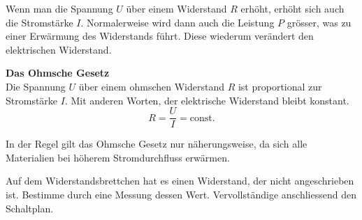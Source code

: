 Wenn man die Spannung $U$ über einem Widerstand $R$ erhöht, erhöht sich auch die Stromstärke $I$.
Normalerweise wird dann auch die Leistung $P$ grösser, was zu einer Erwärmung des Widerstands führt.
Diese wiederum verändert den elektrischen Widerstand.

\begin{greenbox}
\textbf{Das Ohmsche Gesetz}\\

Die Spannung $U$ über einem ohmschen Widerstand $R$ ist proportional zur Stromstärke $I$.
Mit anderen Worten, der elektrische Widerstand bleibt konstant.
$$
    R = \frac{U}{I} = \text{const.}
$$
\end{greenbox}

In der Regel gilt das Ohmsche Gesetz nur näherungsweise, da sich alle Materialien bei
höherem Stromdurchfluss erwärmen.



Auf dem Widerstandsbrettchen hat es einen Widerstand, der nicht
angeschrieben ist. Bestimme durch eine Messung dessen Wert. Vervollständige
anschliessend den Schaltplan.










